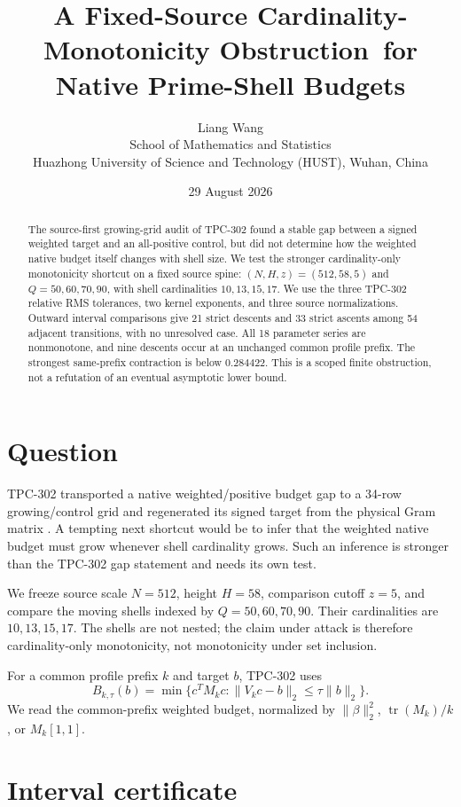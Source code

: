 \documentclass[11pt]{article}
\title{A Fixed-Source Cardinality-Monotonicity Obstruction\
for Native Prime-Shell Budgets}
\author{Liang Wang\\
School of Mathematics and Statistics\\
Huazhong University of Science and Technology (HUST), Wuhan, China}
\date{29 August 2026}
\begin{document}
\maketitle

\begin{abstract}
The source-first growing-grid audit of TPC-302 found a stable gap between a
signed weighted target and an all-positive control, but did not determine how
the weighted native budget itself changes with shell size.  We test the
stronger cardinality-only monotonicity shortcut on a fixed source spine:
$(N,H,z)=(512,58,5)$ and $Q=50,60,70,90$, with shell cardinalities
$10,13,15,17$.  We use the three TPC-302 relative RMS tolerances, two kernel
exponents, and three source normalizations.  Outward interval comparisons give
21 strict descents and 33 strict ascents among 54 adjacent transitions, with no
unresolved case.  All 18 parameter series are nonmonotone, and nine descents
occur at an unchanged common profile prefix.  The strongest same-prefix
contraction is below $0.284422$.  This is a scoped finite obstruction, not a
refutation of an eventual asymptotic lower bound.
\end{abstract}

\section{Question}

TPC-302 transported a native weighted/positive budget gap to a 34-row
growing/control grid and regenerated its signed target from the physical Gram
matrix \cite{tpc302}.  A tempting next shortcut would be to infer that the
weighted native budget must grow whenever shell cardinality grows.  Such an
inference is stronger than the TPC-302 gap statement and needs its own test.

We freeze source scale $N=512$, height $H=58$, comparison cutoff $z=5$, and
compare the moving shells indexed by $Q=50,60,70,90$.  Their cardinalities are
$10,13,15,17$.  The shells are not nested; the claim under attack is therefore
cardinality-only monotonicity, not monotonicity under set inclusion.

For a common profile prefix $k$ and target $b$, TPC-302 uses
\[
 B_{k,\tau}(b)=\min\{c^TM_kc:\|V_kc-b\|_2\leq\tau\|b\|_2\}.
\]
We read the common-prefix weighted budget, normalized by
\(\|\beta\|_2^2\), \(\operatorname{tr}(M_k)/k\), or $M_k[1,1]$.

\section{Interval certificate}
\end{document}
